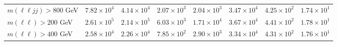 \begin{table}[htp]
{\begin{tabular}{l | c c c c | c c c}
      $m(\ell\ell jj) > 800$ GeV & $7.82 \times 10^{4}$ & $4.14 \times 10^{4}$ & $2.07 \times 10^{3}$ & $2.04 \times 10^{3}$ & $3.47 \times 10^{4}$ & $4.25 \times 10^{2}$ & $1.74 \times 10^{1}$ \\
      $m(\ell\ell) > 200$ GeV & $2.61 \times 10^{5}$ & $2.14 \times 10^{5}$ & $6.03 \times 10^{3}$ & $1.71 \times 10^{4}$ & $3.67 \times 10^{4}$ & $4.41 \times 10^{2}$ & $1.78 \times 10^{1}$ \\
      $m(\ell\ell) > 400$ GeV & $2.58 \times 10^{4}$ & $2.26 \times 10^{4}$ & $7.85 \times 10^{2}$ & $2.90 \times 10^{3}$ & $3.34 \times 10^{4}$ & $4.31 \times 10^{2}$ & $1.76 \times 10^{1}$ \\
      \hline
    \end{tabular}
  }
\end{table}
